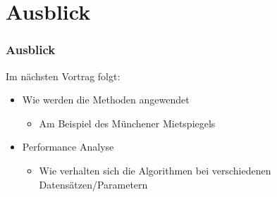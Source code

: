 \documentclass{beamer}
\begin{document}
\section{Ausblick}

\begin{frame}
  \frametitle{Ausblick}
  
  Im nächsten Vortrag folgt:
  \begin{itemize}
  \item Wie werden die Methoden angewendet
    \begin{itemize}
    \item Am Beispiel des Münchener Mietspiegels
    \end{itemize}
  \item Performance Analyse
    \begin{itemize}
    \item Wie verhalten sich die Algorithmen bei verschiedenen Datensätzen/Parametern 
    \end{itemize}
  \end{itemize}

\end{frame}
\end{document}
